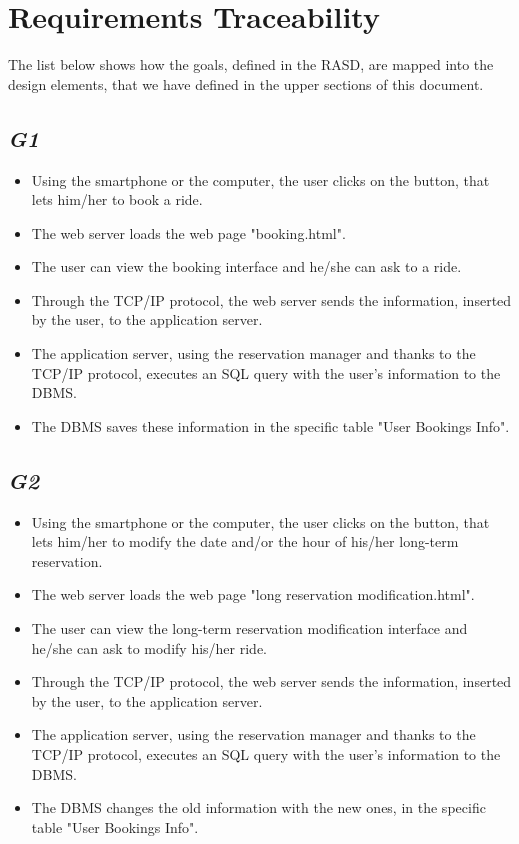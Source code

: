 \section{Requirements Traceability}
The list below shows how the goals, defined in the RASD, are mapped into the design elements, that we have defined in the upper sections of this document.
	\subsection {\emph{G1}}
		\begin{itemize}
			\item Using the smartphone or the computer, the user clicks on the button, that lets him/her to book a ride.
			\item The web server loads the web page "booking.html".
			\item The user can view the booking interface and he/she can ask to a ride.
			\item Through the TCP/IP protocol, the web server sends the information, inserted by the user, to the application server.
			\item The application server, using the reservation manager and thanks to the TCP/IP protocol, executes an SQL query with the user's information to the DBMS.
			\item The DBMS saves these information in the specific table "User Bookings Info".
		\end{itemize}
	\subsection {\emph{G2}}
		\begin{itemize}
			\item Using the smartphone or the computer, the user clicks on the button, that lets him/her to modify the date and/or the hour of his/her long-term reservation.
			\item The web server loads the web page "long reservation modification.html".
			\item The user can view the long-term reservation modification interface and he/she can ask to modify his/her ride.
			\item Through the TCP/IP protocol, the web server sends the information, inserted by the user, to the application server.
			\item The application server, using the reservation manager and thanks to the TCP/IP protocol, executes an SQL query with the user's information to the DBMS.
			\item The DBMS changes the old information with the new ones, in the specific table "User Bookings Info".
		\end{itemize}
